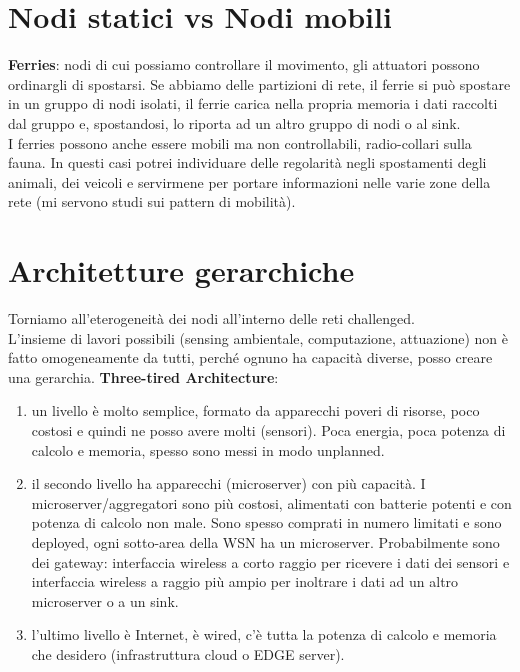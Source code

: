 \documentclass[12pt,italian]{report}
\begin{document}
\section{Nodi statici vs Nodi mobili}
\label{sec:nsnb}
\noindent \textbf{Ferries}: nodi di cui possiamo controllare il movimento, gli attuatori possono ordinargli di spostarsi. Se abbiamo delle partizioni di rete, il ferrie si può spostare in un gruppo di nodi isolati, il ferrie carica nella propria memoria i dati raccolti dal gruppo e, spostandosi, lo riporta ad un altro gruppo di nodi o al sink. \\ I ferries possono anche essere mobili ma non controllabili, radio-collari sulla fauna. In questi casi potrei individuare delle regolarità negli spostamenti degli animali, dei veicoli e servirmene per portare informazioni nelle varie zone della rete (mi servono studi sui pattern di mobilità). 

\section{Architetture gerarchiche}
\label{sec:ag}
Torniamo all'eterogeneità dei nodi all'interno delle reti challenged. \\ L'insieme di lavori possibili (sensing ambientale, computazione, attuazione) non è fatto omogeneamente da tutti, perché ognuno ha capacità diverse, posso creare una gerarchia.
\bigbreak
\noindent \textbf{Three-tired Architecture}: 
\begin{enumerate}
    \item un livello è molto semplice, formato da apparecchi poveri di risorse, poco costosi e quindi ne posso avere molti (sensori). Poca energia, poca potenza di calcolo e memoria, spesso sono messi in modo unplanned.
    \item il secondo livello ha apparecchi (microserver) con più capacità. I microserver/aggregatori sono più costosi, alimentati con batterie potenti e con potenza di calcolo non male. Sono spesso comprati in numero limitati e sono deployed, ogni sotto-area della WSN ha un microserver. Probabilmente sono dei gateway: interfaccia wireless a corto raggio per ricevere i dati dei sensori e interfaccia wireless a raggio più ampio per inoltrare i dati ad un altro microserver o a un sink. 
    \item l'ultimo livello è Internet, è wired, c'è tutta la potenza di calcolo e memoria che desidero (infrastruttura cloud o EDGE server). 
\end{enumerate}
\end{document}
